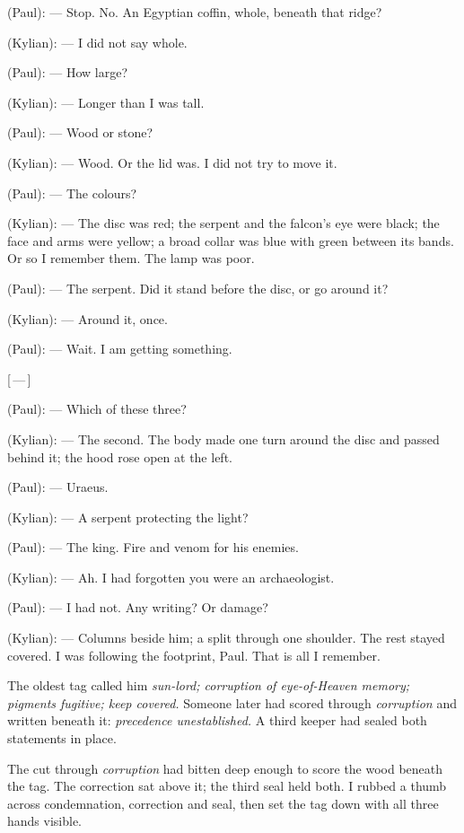 \begin{room}

(Paul): --- Stop. No. An Egyptian coffin, whole, beneath that ridge?

(Kylian): --- I did not say whole.

(Paul): --- How large?

(Kylian): --- Longer than I was tall.

(Paul): --- Wood or stone?

(Kylian): --- Wood. Or the lid was. I did not try to move it.

(Paul): --- The colours?

(Kylian): --- The disc was red; the serpent and the falcon's eye were black; the face and arms were yellow; a broad collar was blue with green between its bands. Or so I remember them. The lamp was poor.

(Paul): --- The serpent. Did it stand before the disc, or go around it?

(Kylian): --- Around it, once.

(Paul): --- Wait. I am getting something.

\centerline{[\,---\,]}

(Paul): --- Which of these three?

(Kylian): --- The second. The body made one turn around the disc and passed behind it; the hood rose open at the left.

(Paul): --- Uraeus.

(Kylian): --- A serpent protecting the light?

(Paul): --- The king. Fire and venom for his enemies.

(Kylian): --- Ah. I had forgotten you were an archaeologist.

(Paul): --- I had not. Any writing? Or damage?

(Kylian): --- Columns beside him; a split through one shoulder. The rest stayed covered. I was following the footprint, Paul. That is all I remember.

\end{room}

The oldest tag called him \textit{sun-lord; corruption of eye-of-Heaven memory; pigments fugitive; keep covered.} Someone later had scored through \textit{corruption} and written beneath it: \textit{precedence unestablished.} A third keeper had sealed both statements in place.\par

The cut through \textit{corruption} had bitten deep enough to score the wood beneath the tag. The correction sat above it; the third seal held both. I rubbed a thumb across condemnation, correction and seal, then set the tag down with all three hands visible.\par

